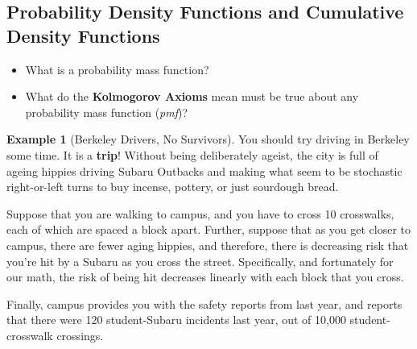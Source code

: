 \documentclass[
]{book}
\providecommand{\tightlist}{%
  \setlength{\itemsep}{0pt}\setlength{\parskip}{0pt}}
\theoremstyle{definition}
\theoremstyle{definition}
\newtheorem{example}{Example}[chapter]
\theoremstyle{definition}
\theoremstyle{definition}
\theoremstyle{remark}
\begin{document}
\hypertarget{probability-density-functions-and-cumulative-density-functions}{%
\subsection{Probability Density Functions and Cumulative Density Functions}\label{probability-density-functions-and-cumulative-density-functions}}

\begin{itemize}
\tightlist
\item
  What is a probability mass function?
\item
  What do the \textbf{Kolmogorov Axioms} mean must be true about any probability mass function (\emph{pmf})?
\end{itemize}

\begin{example}[Berkeley Drivers, No Survivors]

You should try driving in Berkeley some time. It is a \textbf{trip}! Without being deliberately ageist, the city is full of ageing hippies driving Subaru Outbacks and making what seem to be stochastic right-or-left turns to buy incense, pottery, or just sourdough bread.

Suppose that you are walking to campus, and you have to cross 10 crosswalks, each of which are spaced a block apart. Further, suppose that as you get closer to campus, there are fewer aging hippies, and therefore, there is decreasing risk that you're hit by a Subaru as you cross the street. Specifically, and fortunately for our math, the risk of being hit decreases linearly with each block that you cross.

Finally, campus provides you with the safety reports from last year, and reports that there were 120 student-Subaru incidents last year, out of 10,000 student-crosswalk crossings.


\end{example}
\end{document}
